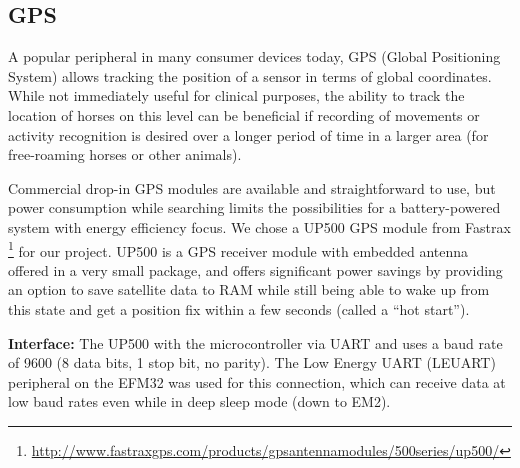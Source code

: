 \subsection{GPS}
A popular peripheral in many consumer devices today, GPS (Global Positioning System) allows tracking the position of a sensor in terms of global coordinates. While not immediately useful for clinical purposes, the ability to track the location of horses on this level can be beneficial if recording of movements or activity recognition is desired over a longer period of time in a larger area (for free-roaming horses or other animals). 

Commercial drop-in GPS modules are available and straightforward to use, but power consumption while searching limits the possibilities for a battery-powered system with energy efficiency focus. We chose a UP500 GPS module from Fastrax \footnote{\url{http://www.fastraxgps.com/products/gpsantennamodules/500series/up500/}}
for our project. UP500 is a GPS receiver module with embedded antenna offered in a very small package, and offers significant power savings by providing an option to save satellite data to RAM while still being able to wake up from this state and get a position fix within a few seconds (called a “hot start”). 

\textbf{Interface:} The UP500 with the microcontroller via UART and uses a baud rate of 9600 (8 data bits, 1 stop bit, no parity). The Low Energy UART (LEUART) peripheral on the EFM32 was used for this connection, which can receive data at low baud rates even while in deep sleep mode (down to EM2).


